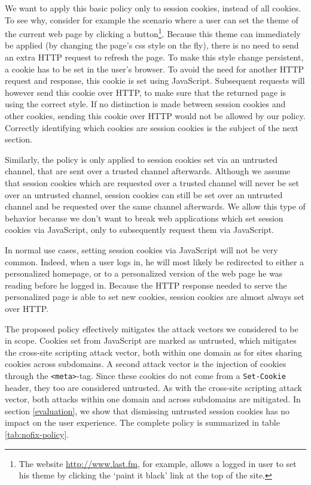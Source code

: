 We want to apply this basic policy only to \glspl{session cookie}, instead of all cookies. To see why, consider for example the scenario where a user can set the theme of the current web page by clicking a button\footnote{The website \url{http://www.last.fm}, for example, allows a logged in user to set his theme by clicking the `paint it black' link at the top of the site.}. Because this theme can immediately be applied (by changing the page's css style on the fly), there is no need to send an extra HTTP request to refresh the page. To make this style change persistent, a cookie has to be set in the user's browser. To avoid the need for another HTTP request and response, this cookie is set using JavaScript. Subsequent requests will however send this cookie over HTTP, to make sure that the returned page is using the correct style. If no distinction is made between session cookies and other cookies, sending this cookie over HTTP would not be allowed by our policy. Correctly identifying which cookies are session cookies is the subject of the next section.

Similarly, the policy is only applied to session cookies set via an untrusted channel, that are sent over a trusted channel afterwards. Although we assume that session cookies which are requested over a trusted channel will never be set over an untrusted channel, session cookies can still be set over an untrusted channel and be requested over the same channel afterwards. We allow this type of behavior because we don't want to break web applications which set session cookies via JavaScript, only to subsequently request them via JavaScript. 

In normal use cases, setting session cookies via JavaScript will not be very common. Indeed, when a user logs in, he will most likely be redirected to either a personalized homepage, or to a personalized version of the web page he was reading before he logged in. Because the HTTP response needed to serve the personalized page is able to set new cookies, session cookies are almost always set over HTTP.

The proposed policy effectively mitigates the attack vectors we considered to be in scope. Cookies set from JavaScript are marked as untrusted, which mitigates the cross-site scripting attack vector, both within one domain as for sites sharing cookies across subdomains. A second attack vector is the injection of cookies through the \texttt{<meta>}-tag. Since these cookies do not come from a \texttt{Set-Cookie} header, they too are considered untrusted. As with the cross-site scripting attack vector, both attacks within one domain and across subdomains are mitigated. In section \ref{evaluation}, we show that dismissing untrusted session cookies has no impact on the user experience. The complete policy is summarized in table \ref{tab:nofix-policy}.


